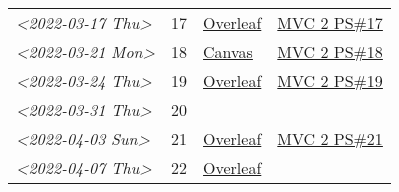 \documentclass[letterpaper]{article}
\begin{document}
\begin{center}
\begin{tabular}{lrll}
\textit{<2022-03-17 Thu>} & 17 & \href{https://www.overleaf.com/project/6231772f4c6371c98cbaabd1}{Overleaf} & \href{../../../src/mathematics/multi_variable_calculus/KBhmvc_2_ps_17.org}{MVC 2 PS\#17}\\
\textit{<2022-03-21 Mon>} & 18 & \href{https://nuevaschool.instructure.com/courses/4135/assignments/68844}{Canvas} & \href{../../../src/mathematics/multi_variable_calculus/KBhmvc_2_ps_18.org}{MVC 2 PS\#18}\\
\textit{<2022-03-24 Thu>} & 19 & \href{https://www.overleaf.com/project/623890fa572c20eb441fee68}{Overleaf} & \href{../../../src/mathematics/multi_variable_calculus/KBh2_ps_19.org}{MVC 2 PS\#19}\\
\textit{<2022-03-31 Thu>} & 20 &  & \\
\textit{<2022-04-03 Sun>} & 21 & \href{https://www.overleaf.com/project/6249e9f782a57a451c5682c5}{Overleaf} & \href{../../../src/mathematics/multi_variable_calculus/KBhmvc_2_ps_21.org}{MVC 2 PS\#21}\\
\textit{<2022-04-07 Thu>} & 22 & \href{https://www.overleaf.com/project/624dee9cdb42f35fa74609ac}{Overleaf} & \\
\end{tabular}
\end{center}
\end{document}
